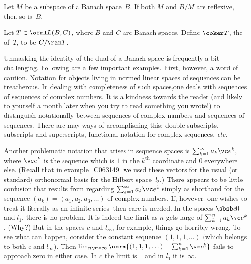 \begin{cor} Let $M$ be a subspace of a Banach space~$B$.  If both $M$ and $B/M$ are reflexive,
then so is~$B$.
\end{cor}




















\begin{defn} Let $T \in \ofml L(B,C)$, where $B$ and $C$ are Banach spaces.  Define
$\coker T$, the
 of~$T$, to be $C/\ran T$.
\end{defn}



Unmasking the identity of the dual of a Banach space is frequently a bit challenging.  Following are a few
important examples.  First, however, a word of caution.  Notation for objects living in normed linear spaces
of sequences can be treacherous.  In dealing with completeness of such spaces,one deals with sequences of
sequences of complex numbers.  It is a kindness towards the reader (and likely to yourself a month later
when you try to read something you wrote!) to distinguish notationally between sequences of complex numbers
and sequences of sequences. There are may ways of accomplishing this: double subscripts, subscripts and
superscripts, functional notation for complex sequences, \emph{etc.}

Another problematic notation that arises in sequence spaces is $\sum_{k=1}^\infty a_k \vc e^k$, where $\vc e^k$
is the sequence which is $1$ in the $k^{\text{th}}$ coordinate and $0$ everywhere else. (Recall that in
example~\ref{C063149} we used these vectors for the usual (or standard) orthonormal basis for the Hilbert
space~$l_2$.)  There appears to be little confusion that results from regarding $\sum_{k=1}^\infty a_k \vc e^k$
simply as shorthand for the sequence $(a_k) = (a_1,a_2,a_3,\dots)$ of complex numbers.  If, however, one wishes
to treat it literally as an infinite series, then care is needed.  In the spaces $\sbsb c0$ and $l_1$, there is
no problem. It is indeed the limit as $n$ gets large of $\sum_{k=1}^n a_k \vc e^k$.  (Why?)  But in the spaces
$c$ and $l_\infty$, for example, things go horribly wrong.  To see what can happen, consider the constant sequence
$(1,1,1,\dots)$ (which belongs to both $c$ and $l_\infty$). Then
$\lim_{n \sto\infty}\norm{(1,1,1,\dots) - \sum_{k=1}^n \vc e^k}$ fails to approach zero in either case.
In $c$ the limit is $1$ and in $l_1$ it is~$\infty$.

